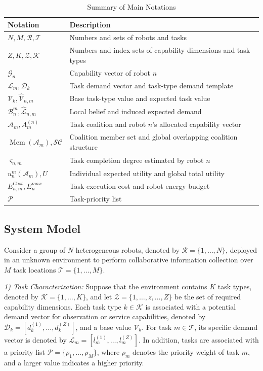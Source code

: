 \documentclass[journal,twoside,web]{ieeecolor}
\begin{document}
\begin{table}[htbp]
    \centering
    \caption{Summary of Main Notations}
    \label{tab:notations}
    \footnotesize
    \setlength{\tabcolsep}{4pt}
    \begin{tabular}{p{3.1cm} p{3.5cm}}
        \toprule
        \textbf{Notation} & \textbf{Description} \\
        \midrule
        $N, M, \mathcal{R}, \mathcal{T}$ & Numbers and sets of robots and tasks \\
        $Z, K, \mathcal{Z}, \mathcal{K}$ & Numbers and index sets of capability dimensions and task types \\
        $\mathcal{G}_n$ & Capability vector of robot $n$ \\
        $\mathcal{L}_m, \mathcal{D}_k$ & Task demand vector and task-type demand template \\
        $\mathcal{V}_k, \widehat{\mathcal{V}}_{n,m}$ & Base task-type value and expected task value \\
        $\mathcal{B}_{n}^m, \widehat{\mathcal{L}}_{n,m}$ & Local belief and induced expected demand \\
        $\mathcal{A}_m, A_m^{(n)}$ & Task coalition and robot $n$'s allocated capability vector \\
        $\operatorname{Mem}(\mathcal{A}_m), \mathcal{SC}$ & Coalition member set and global overlapping coalition structure \\
        $\varsigma_{n,m}$ & Task completion degree estimated by robot $n$ \\
        $u_n^m(\mathcal{A}_m), U$ & Individual expected utility and global total utility \\
        $E_{n,m}^{Cost}, E_n^{max}$ & Task execution cost and robot energy budget \\
        $\mathcal{P}$ & Task-priority list \\
        \bottomrule
    \end{tabular}
\end{table}
\subsection{System Model}

Consider a group of $N$ heterogeneous robots, denoted by $\mathcal{R} = \{1, \dots, N\}$, deployed in an unknown environment to perform collaborative information collection over $M$ task locations $\mathcal{T} = \{1, \dots, M\}$.

\noindent\textit{1) Task Characterization:} Suppose that the environment contains $K$ task types, denoted by $\mathcal{K} = \{1, \dots, K\}$, and let $\mathcal{Z} = \{1,\ldots,z,\ldots,Z\}$ be the set of required capability dimensions. Each task type $k \in \mathcal{K}$ is associated with a potential demand vector for observation or service capabilities, denoted by $\mathcal{D}_k = [d_k^{(1)}, \dots, d_k^{(Z)}]$, and a base value $\mathcal{V}_k$. For task $m \in \mathcal{T}$, its specific demand vector is denoted by $\mathcal{L}_m = [l_m^{(1)}, \dots, l_m^{(Z)}]$. In addition, tasks are associated with a priority list $\mathcal{P} = \{\rho_1, \dots, \rho_M\}$, where $\rho_m$ denotes the priority weight of task $m$, and a larger value indicates a higher priority.
\end{document}
